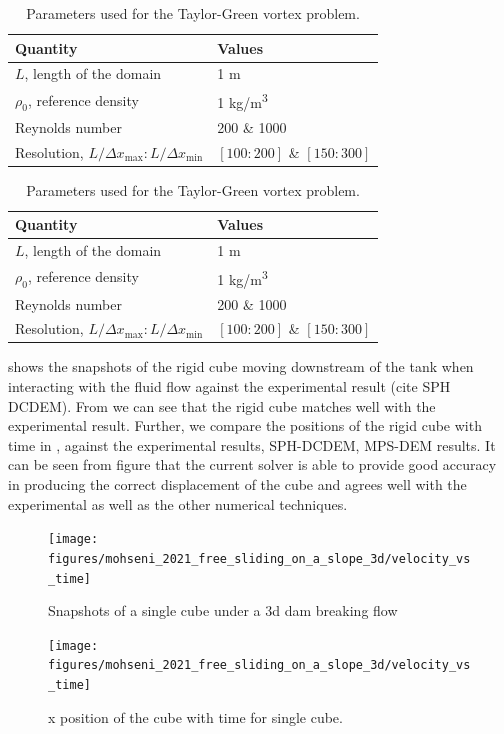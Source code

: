 \documentclass[preprint,12pt]{elsarticle}
\begin{document}
\begin{table}[!ht]
  \centering
  \begin{tabular}[!ht]{ll}
    \toprule
    Quantity & Values\\
    \midrule
    $L$, length of the domain & 1 m \\
    $\rho_0$, reference density & 1 kg/m\textsuperscript{3} \\
    Reynolds number & 200 \& 1000 \\
    Resolution, $L/\Delta x_{\max} : L/\Delta x_{\min}$ & $[100:200]$ \& $[150:300]$\\
    \bottomrule
  \end{tabular}
  \caption{Parameters used for the Taylor-Green vortex problem.}%
  \label{tab:material-properties-3d-dam-breaking-flow-hitting-cubes}
\end{table}

\begin{table}[!ht]
  \centering
  \begin{tabular}[!ht]{ll}
    \toprule
    Quantity & Values\\
    \midrule
    $L$, length of the domain & 1 m \\
    $\rho_0$, reference density & 1 kg/m\textsuperscript{3} \\
    Reynolds number & 200 \& 1000 \\
    Resolution, $L/\Delta x_{\max} : L/\Delta x_{\min}$ & $[100:200]$ \& $[150:300]$\\
    \bottomrule
  \end{tabular}
  \caption{Parameters used for the Taylor-Green vortex problem.}%
  \label{tab:numerical-properties-3d-dam-breaking-flow-hitting-cubes}
\end{table}

 shows the snapshots of
the rigid cube moving downstream of the tank when interacting with the fluid
flow against the experimental result (cite SPH DCDEM). From
 we can see that the
rigid cube matches well with the experimental result. Further, we compare the
positions of the rigid cube with time in
, against the
experimental results, SPH-DCDEM, MPS-DEM results. It can be seen from figure
 that the current solver
is able to provide good accuracy in producing the correct displacement of the
cube and agrees well with the experimental as well as the other numerical
techniques.
\begin{figure}[!htpb]
  \centering
  \texttt{[image: figures/mohseni\_2021\_free\_sliding\_on\_a\_slope\_3d/velocity\_vs\_time]}
  \caption{Snapshots of a single cube under a 3d dam breaking flow}
\label{fig:snapshots-single-cube-3d-dam-breaking-flow}
\end{figure}
\begin{figure}[!htpb]
  \centering
  \texttt{[image: figures/mohseni\_2021\_free\_sliding\_on\_a\_slope\_3d/velocity\_vs\_time]}
  \caption{x position of the cube with time for single cube.}
\label{fig:x-position-single-cube-3d-dam-breaking-flow}
\end{figure}
\end{document}
